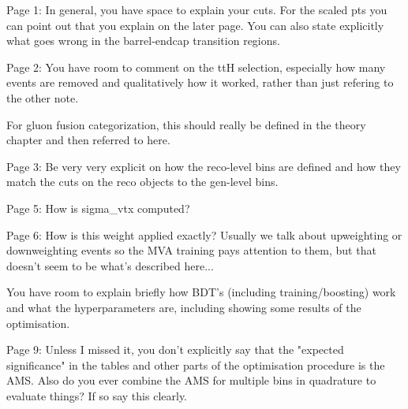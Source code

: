 Page 1: In general, you have space to explain your cuts. 
For the scaled pts you can point out that you explain on the later page. 
You can also state explicitly what goes wrong in the barrel-endcap transition regions.

Page 2:  You have room to comment on the ttH selection, 
especially how many events are removed and qualitatively how it worked, 
rather than just refering to the other note.

For gluon fusion categorization, 
this should really be defined in the theory chapter and then referred to here.  

Page 3: Be very very explicit on how the reco-level bins are defined 
and how they match the cuts on the reco objects to the gen-level bins.

Page 5: How is sigma_vtx computed? 

Page 6: How is this weight applied exactly? 
Usually we talk about upweighting or downweighting events 
so the MVA training pays attention to them, but that doesn't seem to be what's described here...

You have room to explain briefly how BDT's (including training/boosting) work 
and what the hyperparameters are, including showing some results of the optimisation.

Page 9: Unless I missed it, you don't explicitly say that the "expected significance" in the tables 
and other parts of the optimisation procedure is the AMS. 
Also do you ever combine the AMS for multiple bins in quadrature to evaluate things? 
If so say this clearly.
